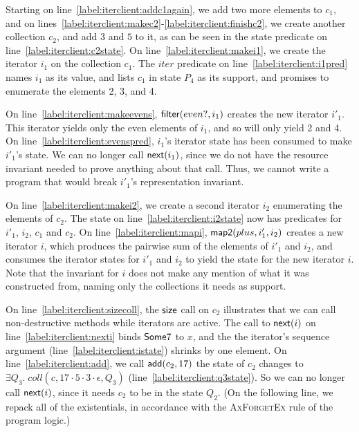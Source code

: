 Starting on line~\ref{label:iterclient:addc1again}, we add two more
elements to $c_1$, and on
lines~\ref{label:iterclient:makec2}-\ref{label:iterclient:finishc2},
we create another collection $c_2$, and add $3$ and $5$ to it, as can
be seen in the state predicate on
line~\ref{label:iterclient:c2state}. On
line~\ref{label:iterclient:makei1}, we create the iterator $i_1$ on
the collection $c_1$. The $iter$ predicate on
line~\ref{label:iterclient:i1pred} names $i_1$ as its value, and lists
$c_1$ in state $P_4$ as its support, and promises to enumerate the
elements 2, 3, and 4.

On line~\ref{label:iterclient:makeevens}, $\mathsf{filter}(even?, i_1)$
creates the new iterator $i'_1$. This iterator yields only the even
elements of $i_1$, and so will only yield 2 and 4. On
line~\ref{label:iterclient:evenspred}, $i_1$'s iterator state has been
consumed to make $i'_1$'s state. We can no longer call
$\mathsf{next}(i_1)$, since we do not have the resource invariant needed
to prove anything about that call. Thus, we cannot write a program
that would break $i'_1$'s representation invariant.

On line~\ref{label:iterclient:makei2}, we create a second iterator
$i_2$ enumerating the elements of $c_2$. The state on line~\ref{label:iterclient:i2state} now has
predicates for $i'_1$, $i_2$, $c_1$ and $c_2$. On line~\ref{label:iterclient:mapi},
$\mathsf{map2}(plus, i'_1, i_2)$ creates a new iterator $i$, which
produces the pairwise sum of the elements of $i'_1$ and $i_2$, and
consumes the iterator states for $i'_1$ and $i_2$ to yield the state
for the new iterator $i$. Note that the invariant for $i$ does not
make any mention of what it was constructed from, naming only the
collections it needs as support.

On line~\ref{label:iterclient:sizecoll}, the $\mathsf{size}$ call on $c_2$
illustrates that we can call non-destructive methods while iterators
are active. The call to $\mathsf{next}(i)$ on
line~\ref{label:iterclient:nexti} binds $\mathsf{Some }7$ to $x$, and
the the iterator's sequence argument
(line~\ref{label:iterclient:istate}) shrinks by one element. On
line~\ref{label:iterclient:add}, we call $\mathsf{add}(c_2, 17)$ the state
of $c_2$ changes to $\exists Q_3.\; coll(c, 17\cdot 5 \cdot
3\cdot\epsilon, Q_3)$ (line~\ref{label:iterclient:q3state}). So we can
no longer call $\mathsf{next}(i)$, since it needs $c_2$ to be in the state
$Q_2$. (On the following line, we repack all of the existentials, in
accordance with the \textsc{AxForgetEx} rule of the program logic.)

